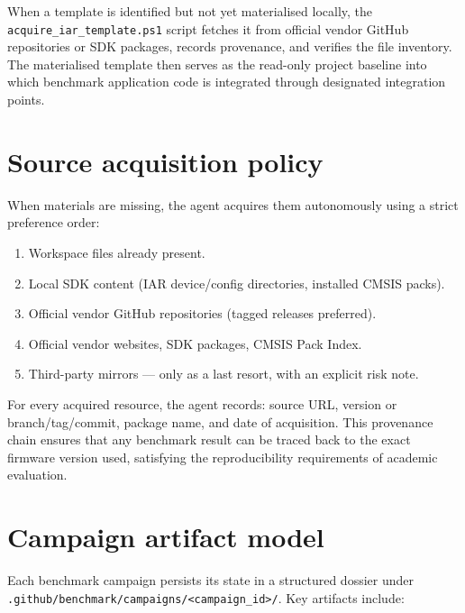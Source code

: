 When a template is identified but not yet materialised locally, the
\texttt{acquire\_iar\_template.ps1} script fetches it from official vendor GitHub
repositories or SDK packages, records provenance, and verifies the file inventory. The
materialised template then serves as the read-only project baseline into which benchmark
application code is integrated through designated integration points.

\section{Source acquisition policy}
\label{sec:agent-acquisition}

When materials are missing, the agent acquires them autonomously using a strict preference
order:

\begin{enumerate}
\item Workspace files already present.
\item Local SDK content (IAR device/config directories, installed CMSIS packs).
\item Official vendor GitHub repositories (tagged releases preferred).
\item Official vendor websites, SDK packages, CMSIS Pack Index.
\item Third-party mirrors --- only as a last resort, with an explicit risk note.
\end{enumerate}

For every acquired resource, the agent records: source URL, version or branch/tag/commit,
package name, and date of acquisition. This provenance chain ensures that any benchmark
result can be traced back to the exact firmware version used, satisfying the
reproducibility requirements of academic evaluation.

\section{Campaign artifact model}
\label{sec:agent-artifacts}

Each benchmark campaign persists its state in a structured dossier under
\texttt{.github/benchmark/campaigns/<campaign\_id>/}. Key artifacts include:

